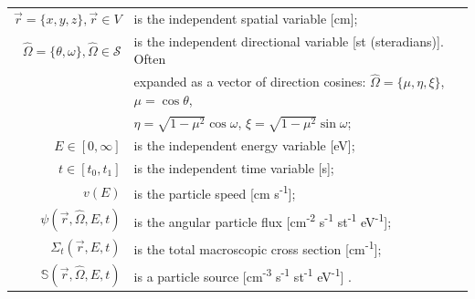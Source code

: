 \begin{tabular}{rl}
    $\vec{r} = \{x,y,z\}, \vec{r} \in V$             & is the independent spatial variable [cm];\\
    $\hat{\Omega} = \{\theta, \omega\}, \hat{\Omega}\in \mathcal{S}$ & is the independent directional variable [st (steradians)]. Often \\
    &expanded as a vector of direction cosines: $\hat{\Omega} = \{\mu, \eta, \xi\}$, $\mu = \cos\theta$, \\
    & $\eta = \sqrt{1 - \mu^2}\cos\omega$, $\xi = \sqrt{1 - \mu^2}\sin\omega$;\\
    $E\in [0, \infty]$                               & is the independent energy variable [eV];\\
    $t\in [t_{0}, t_{1}]$                            & is the independent time variable [s];\\
    $v(E)$                                           & is the particle speed [cm s\textsuperscript{-1}];\\
    $\psi(\vec{r}, \hat{\Omega}, E, t)$              & is the angular particle flux [cm\textsuperscript{-2} s\textsuperscript{-1} st\textsuperscript{-1} eV\textsuperscript{-1}];\\
    $\Sigma_{t}(\vec{r}, E, t)$                      & is the total macroscopic cross section [cm\textsuperscript{-1}];\\
    $\mathbb{S}(\vec{r}, \hat{\Omega}, E, t)$        & is a particle source [cm\textsuperscript{-3} s\textsuperscript{-1} st\textsuperscript{-1} eV\textsuperscript{-1}] \cite{computational_methods}.
\end{tabular}
\newline

